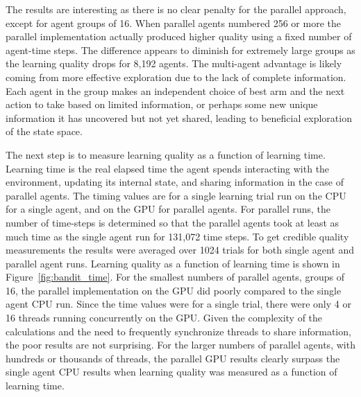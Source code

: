 \begin{flushleft}


The results are interesting as there is no clear penalty for the parallel approach, except for agent groups of 16.  When parallel agents numbered 256 or more the parallel implementation actually produced higher quality using a fixed number of agent-time steps.  The difference appears to diminish for extremely large groups as the learning quality drops for 8,192 agents.  The multi-agent advantage is likely coming from more effective exploration due to the lack of complete information.  Each agent in the group makes an independent choice of best arm and the next action to take based on limited information, or perhaps some new unique information it has uncovered but not yet shared, leading to beneficial exploration of the state space.

The next step is to measure learning quality as a function of learning time.  Learning time is the real elapsed time the agent spends interacting with the environment, updating its internal state, and sharing information in the case of parallel agents.  The timing values are for a single learning trial run on the CPU for a single agent, and on the GPU for parallel agents. For parallel runs, the number of time-steps is determined so that the parallel agents took at least as much time as the single agent run for 131,072 time steps.  To get credible quality measurements the results were averaged over 1024 trials for both single agent and parallel agent runs.  Learning quality as a function of learning time is shown in Figure~\ref{fig:bandit_time}.  For the smallest numbers of parallel agents, groups of 16, the parallel implementation on the GPU did poorly compared to the single agent CPU run.  Since the time values were for a single trial, there were only 4 or 16 threads running concurrently on the GPU.  Given the complexity of the calculations and the need to frequently synchronize threads to share information, the poor results are not surprising.  For the larger numbers of parallel agents, with hundreds or thousands of threads, the parallel GPU results clearly surpass the single agent CPU results when learning quality was measured as a function of learning time.


\end{flushleft}

